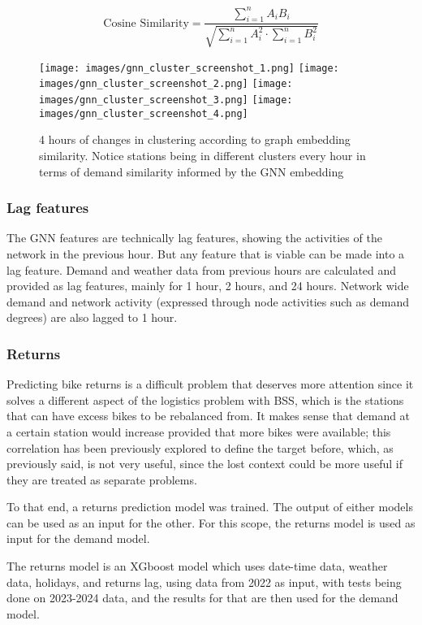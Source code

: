 \documentclass{article}
\begin{document}
\[
\text{Cosine Similarity} = \frac{\sum_{i=1}^{n} A_i B_i}{\sqrt{\sum_{i=1}^{n} A_i^2 \cdot \sum_{i=1}^{n} B_i^2}}
\]


\begin{figure}
    
    \texttt{[image: images/gnn\_cluster\_screenshot\_1.png]}
    \texttt{[image: images/gnn\_cluster\_screenshot\_2.png]}
    \texttt{[image: images/gnn\_cluster\_screenshot\_3.png]}
    \texttt{[image: images/gnn\_cluster\_screenshot\_4.png]}
    \caption{4 hours of changes in clustering according to graph embedding similarity. Notice stations being in different clusters every hour in terms of demand similarity informed by the GNN embedding}\label{fig:foobar}
\label{fig:hours_clustering}
\end{figure}


\subsubsection{Lag features}
The GNN features are technically lag features, showing the activities of the network in the previous hour. But any feature that is viable can be made into a lag feature. Demand and weather data from previous hours are calculated and provided as lag features, mainly for 1 hour, 2 hours, and 24 hours. Network wide demand and network activity (expressed through node activities such as demand degrees) are also lagged to 1 hour.

\subsubsection{Returns}
Predicting bike returns is a difficult problem that deserves more attention since it solves a different aspect of the logistics problem with BSS, which is the stations that can have excess bikes to be rebalanced from. It makes sense that demand at a certain station would increase provided that more bikes were available; this correlation has been previously explored to define the target before\cite{guo2019}, which, as previously said, is not very useful, since the lost context could be more useful if they are treated as separate problems.

To that end, a returns prediction model was trained. The output of either models can be used as an input for the other. For this scope, the returns model is used as input for the demand model.

The returns model is an XGboost model which uses date-time data, weather data, holidays, and returns lag, using data from 2022 as input, with tests being done on 2023-2024 data, and the results for that are then used for the demand model.
\end{document}
